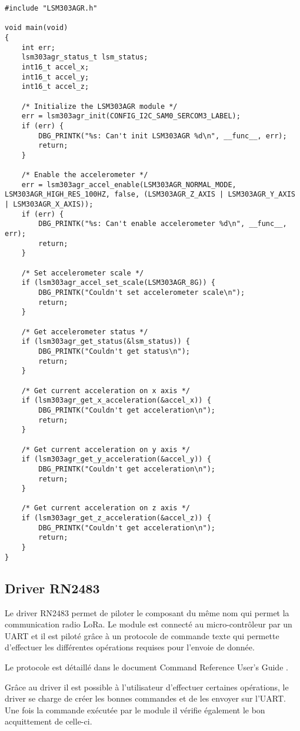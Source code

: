\begin{lstlisting}[style=CStyle]
#include "LSM303AGR.h"

void main(void)
{
	int err;
	lsm303agr_status_t lsm_status;
	int16_t accel_x;
	int16_t accel_y;
	int16_t accel_z;

	/* Initialize the LSM303AGR module */
	err = lsm303agr_init(CONFIG_I2C_SAM0_SERCOM3_LABEL);
	if (err) {
		DBG_PRINTK("%s: Can't init LSM303AGR %d\n", __func__, err);
		return;
	}

	/* Enable the accelerometer */
	err = lsm303agr_accel_enable(LSM303AGR_NORMAL_MODE, LSM303AGR_HIGH_RES_100HZ, false, (LSM303AGR_Z_AXIS | LSM303AGR_Y_AXIS | LSM303AGR_X_AXIS));
	if (err) {
		DBG_PRINTK("%s: Can't enable accelerometer %d\n", __func__, err);
		return;
	}

	/* Set accelerometer scale */
	if (lsm303agr_accel_set_scale(LSM303AGR_8G)) {
		DBG_PRINTK("Couldn't set accelerometer scale\n");
		return;
	}
	
	/* Get accelerometer status */
	if (lsm303agr_get_status(&lsm_status)) {
		DBG_PRINTK("Couldn't get status\n");
		return;	
	}
	
	/* Get current acceleration on x axis */	
	if (lsm303agr_get_x_acceleration(&accel_x)) {
		DBG_PRINTK("Couldn't get acceleration\n");
		return;		
	}

	/* Get current acceleration on y axis */	
	if (lsm303agr_get_y_acceleration(&accel_y)) {
		DBG_PRINTK("Couldn't get acceleration\n");
		return;		
	}
	
	/* Get current acceleration on z axis */	
	if (lsm303agr_get_z_acceleration(&accel_z)) {
		DBG_PRINTK("Couldn't get acceleration\n");
		return;		
	}	
}
\end{lstlisting}


\subsection{Driver RN2483}

Le driver RN2483 permet de piloter le composant du même nom qui permet la communication radio LoRa. Le module est connecté au micro-contrôleur par un UART et il est piloté grâce à un protocole de commande texte qui permette d'effectuer les différentes opérations requises pour l'envoie de donnée.

Le protocole est détaillé dans le document Command Reference User's Guide \cite{rn2483-datasheet}.

Grâce au driver il est possible à l'utilisateur d'effectuer certaines opérations, le driver se charge de créer les bonnes commandes et de les envoyer sur l'UART. Une fois la commande exécutée par le module il vérifie également le bon acquittement de celle-ci.

